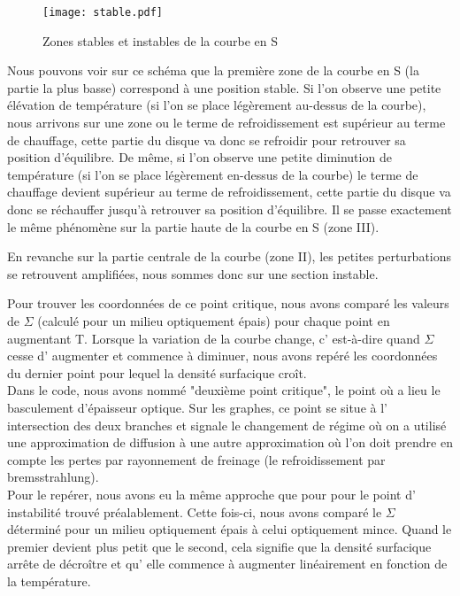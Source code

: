 \begin{figure}[htb!]
	\centering
	\texttt{[image: stable.pdf]}
	\caption{Zones stables et instables de la courbe en S}
	\label{Fig::stable}
\end{figure}

Nous pouvons voir sur ce schéma que la première zone de la courbe en S (la partie la plus basse) correspond à une position stable. Si l'on observe une petite élévation de température (si l'on se place légèrement au-dessus de la courbe), nous arrivons sur une zone ou le terme de refroidissement est supérieur au terme de chauffage, cette partie du disque va donc se refroidir pour retrouver sa position d'équilibre. De même, si l'on observe une petite diminution de température (si l'on se place légèrement en-dessus de la courbe) le terme de chauffage devient supérieur au terme de refroidissement, cette partie du disque va donc se réchauffer jusqu'à retrouver sa position d'équilibre. Il se passe exactement le même phénomène sur la partie haute de la courbe en S (zone III).

En revanche sur la partie centrale de la courbe (zone II), les petites perturbations se retrouvent amplifiées, nous sommes donc sur une section instable.


Pour trouver les coordonnées de ce point critique, nous avons comparé les valeurs de $\Sigma$ (calculé pour un milieu optiquement épais) pour chaque point en augmentant T. Lorsque la variation de la courbe change, c' est-à-dire quand $\Sigma$ cesse d' augmenter et commence à diminuer, nous avons repéré les coordonnées du dernier point pour lequel la densité surfacique croît.  
\\
Dans le code, nous avons nommé "deuxième point critique", le point où a lieu le basculement d'épaisseur optique. Sur les graphes, ce point se situe à l' intersection des deux branches et signale le changement de régime où on a utilisé une approximation de diffusion à une autre approximation où l'on doit prendre en compte les pertes par rayonnement de freinage (le refroidissement par bremsstrahlung).
\\
Pour le repérer, nous avons eu la même approche que pour pour le point d' instabilité trouvé préalablement. Cette fois-ci, nous avons comparé le $\Sigma$ déterminé pour un milieu optiquement épais à celui optiquement mince. Quand le premier devient plus petit que le second, cela signifie que la densité surfacique arrête de décroître et qu' elle commence à augmenter linéairement en fonction de la température. 
\\

